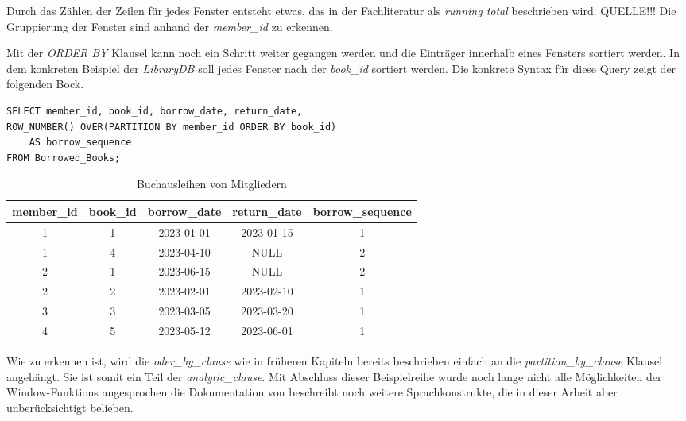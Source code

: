 Durch das Zählen der Zeilen für jedes Fenster entsteht etwas, das in der
Fachliteratur als \textit{running total} beschrieben wird. QUELLE!!! Die Gruppierung
der Fenster sind anhand der \textit{member\_id} zu erkennen.

Mit der \textit{ORDER BY} Klausel kann noch ein Schritt weiter gegangen werden und
die Einträger innerhalb eines Fensters sortiert werden. In dem konkreten
Beispiel der \textit{LibraryDB} soll jedes Fenster nach der \textit{book\_id}
sortiert werden. Die konkrete Syntax für diese Query zeigt der folgenden Bock.

 \begin{lstlisting}
SELECT member_id, book_id, borrow_date, return_date,
ROW_NUMBER() OVER(PARTITION BY member_id ORDER BY book_id)
	AS borrow_sequence
FROM Borrowed_Books;
\end{lstlisting}
\begin{table}[h]
	\centering
	\begin{tabular}{|c|c|c|c|c|}
		\hline
		\textbf{member\_id} & \textbf{book\_id} & \textbf{borrow\_date} & \textbf{return\_date} & \textbf{borrow\_sequence} \\
		\hline
		1                   & 1                 & 2023-01-01            & 2023-01-15            & 1                         \\
		\hline
		1                   & 4                 & 2023-04-10            & NULL                  & 2                         \\
		\hline
		2                   & 1                 & 2023-06-15            & NULL                  & 2                         \\
		\hline
		2                   & 2                 & 2023-02-01            & 2023-02-10            & 1                         \\
		\hline
		3                   & 3                 & 2023-03-05            & 2023-03-20            & 1                         \\
		\hline
		4                   & 5                 & 2023-05-12            & 2023-06-01            & 1                         \\
		\hline
	\end{tabular}
	\caption{Buchausleihen von Mitgliedern}
	\label{tab:member_borrows}
\end{table}

Wie zu erkennen ist, wird die \textit{oder\_by\_clause} wie in früheren Kapiteln
bereits beschrieben einfach an die \textit{partition\_by\_clause} Klausel angehängt.
Sie ist somit ein Teil der \textit{analytic\_clause}. Mit Abschluss dieser
Beispielreihe wurde noch lange nicht alle Möglichkeiten der Window-Funktions
angesprochen die Dokumentation von \citet{oracle} beschreibt noch weitere Sprachkonstrukte,
die in dieser Arbeit aber unberücksichtigt belieben.

